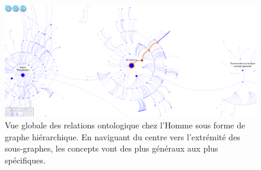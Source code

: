\begin{refsegment}
    \begin{shadedfigure}
        \begin{subfigure}[t]{.5\textwidth}
            \centering
            \includegraphics[angle=90,origin=c,width=\textwidth]{img/reactome_homo_sapiens_metabolism.png}
            \caption{ Vue globale des relations ontologique chez l'Homme sous forme de graphe hiérarchique. En naviguant du centre vers l'extrémité des sous-graphes, les concepts vont des plus généraux aux plus spécifiques. }
            \label{fig:reactome_metabolism}
        \end{subfigure}
    \hfill
    \begin{subfigure}[t]{.45\textwidth}
        \centering

\end{subfigure}
\end{shadedfigure}
\end{refsegment}
